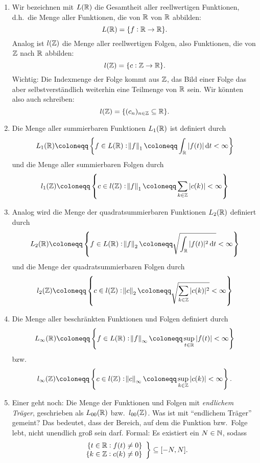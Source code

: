 \begin{definition}[Funktionenräume] \leavevmode
\begin{enumerate}
\item Wir bezeichnen mit $ L(\mathbb{R}) $ die Gesamtheit aller reellwertigen Funktionen, d.h.\ die Menge 
  aller Funktionen, die von $ \mathbb{R} $ von $ \mathbb{R} $ abbilden:
  \[
    L(\mathbb{R}) = \{ f : \mathbb{R} \rightarrow \mathbb{R} \}.
  \]
  Analog ist $ l(\mathbb{Z}) $ die Menge aller reellwertigen Folgen, also Funktionen, die von $ \mathbb{Z} $ nach
  $ \mathbb{R} $ abbilden:
  \[
    l(\mathbb{Z}) = \{ c : \mathbb{Z} \rightarrow \mathbb{R} \}.
  \]
  Wichtig: Die Indexmenge der Folge kommt aus $ \mathbb{Z} $, das Bild einer Folge das aber 
  selbstverständlich weiterhin eine Teilmenge von $ \mathbb{R} $ sein. Wir könnten also auch schreiben:
  \[
    l(\mathbb{Z}) = \{ (c_{n})_{n \in \mathbb{Z}} \subseteq \mathbb{R} \}.
  \]
\item Die Menge aller summierbaren Funktionen $ L_{1}(\mathbb{R}) $ ist definiert durch
\[ 
  L_{1}(\R) \coloneqq \left\{
    f \in L(\R) : \norm{f}_{1} \coloneqq \int_{\R} |f(t)| \dif t < \infty
  \right\}
\]
und die Menge aller summierbaren Folgen durch
\[ 
  l_{1}(\Z) \coloneqq \left\{
    c \in l(\Z) : \norm{f}_{1} \coloneqq \sum_{k \in \Z} |c(k)| < \infty
  \right\}
\]

\item Analog wird die Menge der quadratsummierbaren Funktionen $ L_{2}(\mathbb{R}) $ definiert durch
\[ 
  L_{2}(\R) \coloneqq \left\{
    f \in L(\R) : \norm{f}_{2} \coloneqq \sqrt{ \int_{\R} |f(t)|^{2} \dif t } < \infty
  \right\}
\]
und die Menge der quadratsummierbaren Folgen durch
\[ 
  l_{2}(\Z) \coloneqq \left\{
    c \in l(\Z) : \norm{c}_{2} \coloneqq \sqrt{ \sum_{k \in \Z} |c(k)|^{2} } < \infty
  \right\}
\]
\item Die Menge aller beschränkten Funktionen und Folgen definiert durch
\[
  L_{\infty}(\R) \coloneqq \left\{
    f \in L(\R) : \norm{f}_{\infty} \coloneqq
      \sup_{t \in \R} |f(t)| < \infty
  \right\}
\]
bzw.
\[
  l_{\infty}(\Z) \coloneqq \left\{
    c \in l(\Z) : \norm{c}_{\infty} \coloneqq
      \sup_{k \in \Z} |c(k)| < \infty
  \right\}.
\]
\item Einer geht noch: Die Menge der Funktionen und Folgen mit \emph{endlichem Träger}, geschrieben
als $ L_{00}(\mathbb{R}) $ bzw.\ $ l_{00}(\mathbb{Z}) $. Was ist mit \enquote{endlichem Träger} gemeint? Das 
bedeutet, dass der Bereich, auf dem die Funktion bzw.\ Folge lebt, nicht unendlich groß sein darf.
Formal: Es existiert ein $ N \in \mathbb{N} $, sodass
\[
  \left.
  \begin{array}{r}
    \{ t \in \mathbb{R} : f(t) \neq 0 \} \\
    \{ k \in \mathbb{Z} : c(k) \neq 0 \}
  \end{array}
  \right\}
  \subseteq [-N, N].
\]
\end{enumerate}
\end{definition}

